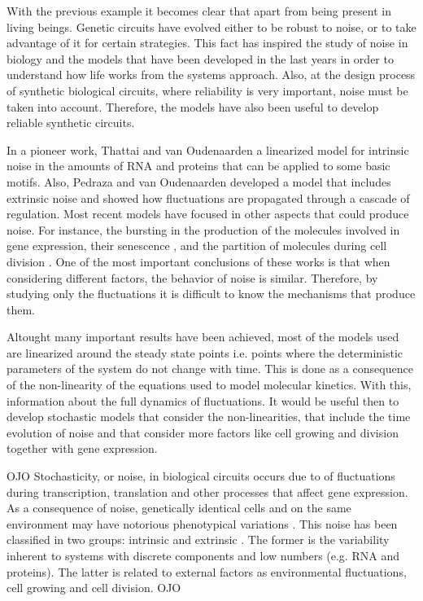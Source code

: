With the previous example it becomes clear that apart from being present in living beings. Genetic circuits have evolved either to be robust to noise, or to take advantage of it for certain strategies. This fact has inspired the study of noise in biology and the models that have been developed in the last years in order to understand how life works from the systems approach. Also, at the design process of synthetic biological circuits, where reliability is very important, noise must be taken into account. Therefore, the models have also been useful to develop reliable synthetic circuits.

In a pioneer work, Thattai and van Oudenaarden \cite{thattai01} a linearized model for intrinsic noise in the amounts of RNA and proteins that can be applied to some basic motifs. Also, Pedraza and van Oudenaarden \cite{pedraza05} developed a model that includes extrinsic noise and showed how fluctuations are propagated through a cascade of regulation. Most recent models have focused in other aspects that could produce noise. For instance, the bursting in the production of the molecules involved in gene expression, their senescence \cite{pedraza08}, and the partition of molecules during cell division \cite{huh11a} \cite{huh11b}. One of the most important conclusions of these works is that when considering different factors, the behavior of noise is similar. Therefore, by studying only the fluctuations it is difficult to know the mechanisms that produce them.

Altought many important results have been achieved, most of the models used are linearized around the steady state points i.e. points where the deterministic parameters of the system do not change with time. This is done as a consequence of the non-linearity of the equations used to model molecular kinetics. With this, information about the full dynamics of fluctuations. It would be useful then to develop stochastic models that consider the non-linearities, that include the time evolution of noise and that consider more factors like cell growing and division together with gene expression.

OJO
Stochasticity, or noise, in biological circuits occurs due to of fluctuations during transcription, translation \cite{kaern05} and other processes that affect gene expression. As a consequence of noise, genetically identical cells and on the same environment may have notorious phenotypical variations \cite{kaern05} \cite{elowitz02} \cite{pedraza05}. This noise has been classified in two groups: intrinsic and extrinsic \cite{elowitz02} \cite{paulsson05}. The former is the variability inherent to systems with discrete components and low numbers (e.g. RNA and proteins). The latter is related to external factors as environmental fluctuations, cell growing and cell division.
OJO

\renewcommand{\thefigure}{\arabic{chapter}.\arabic{section}.\arabic{figure}}

